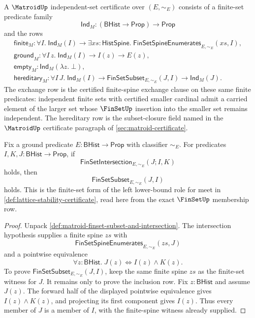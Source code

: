 \begin{definition}
\label{def:matroid-independence-certificate-surface}
A $\MatroidUp$ independent-set certificate over $(E,\sim_E)$ consists of a finite-set predicate family
$$
\mathsf{Ind}_M:(\mathsf{BHist}\to\mathsf{Prop})\to\mathsf{Prop}
$$
and the rows
$$
\begin{gathered}
\mathsf{finite}_M:
\forall I.\;\mathsf{Ind}_M(I)\to
\exists xs:\mathsf{HistSpine}.\;\mathsf{FinSetSpineEnumerates}_{E,\sim_E}(xs,I),\\
\mathsf{ground}_M:
\forall I\,z.\;\mathsf{Ind}_M(I)\to I(z)\to E(z),\\
\mathsf{empty}_M:\mathsf{Ind}_M(\lambda z.\;\bot),\\
\mathsf{hereditary}_M:
\forall I\,J.\;\mathsf{Ind}_M(I)\to
\mathsf{FinSetSubset}_{E,\sim_E}(J,I)\to
\mathsf{Ind}_M(J).
\end{gathered}
$$
The exchange row is the certified finite-spine exchange clause on these same finite predicates: independent finite sets with certified smaller cardinal admit a carried element of the larger set whose $\FinSetUp$ insertion into the smaller set remains independent. The hereditary row is the subset-closure field named in the $\MatroidUp$ certificate paragraph of \autoref{sec:matroid-certificate}.
\end{definition}

\begin{lemma}
\label{lem:matroid-finset-intersection-left-subset}
Fix a ground predicate $E:\mathsf{BHist}\to\mathsf{Prop}$ with classifier $\sim_E$. For predicates $I,K,J:\mathsf{BHist}\to\mathsf{Prop}$, if
$$
\mathsf{FinSetIntersection}_{E,\sim_E}(J;I,K)
$$
holds, then
$$
\mathsf{FinSetSubset}_{E,\sim_E}(J,I)
$$
holds. This is the finite-set form of the left lower-bound role for meet in \autoref{def:lattice-stability-certificate}, read here from the exact $\FinSetUp$ membership row.
\end{lemma}
\begin{proof}
Unpack \autoref{def:matroid-finset-subset-and-intersection}. The intersection hypothesis supplies a finite spine $zs$ with
$$
\mathsf{FinSetSpineEnumerates}_{E,\sim_E}(zs,J)
$$
and a pointwise equivalence
$$
\forall z:\mathsf{BHist}.\;J(z)\Longleftrightarrow I(z)\land K(z).
$$
To prove $\mathsf{FinSetSubset}_{E,\sim_E}(J,I)$, keep the same finite spine $zs$ as the finite-set witness for $J$. It remains only to prove the inclusion row. Fix $z:\mathsf{BHist}$ and assume $J(z)$. The forward half of the displayed pointwise equivalence gives $I(z)\land K(z)$, and projecting its first component gives $I(z)$. Thus every member of $J$ is a member of $I$, with the finite-spine witness already supplied.
\end{proof}


